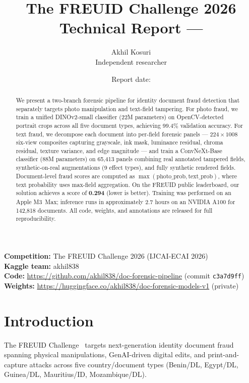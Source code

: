 \documentclass[11pt,a4paper]{article}
\title{%
  \textbf{The FREUID Challenge 2026}\\[0.4em]
  \large Technical Report --- \teamname
}
\author{%
  Akhil Kosuri\\
  \small Independent researcher\\
  \texttt{\contactemail}
}
\date{Report date: \reportdate}
\newcommand{\kaggleteam}{akhil838}
\begin{document}
\maketitle

\begin{abstract}
We present a two-branch forensic pipeline for identity document fraud detection
that separately targets photo manipulation and text-field tampering.
For photo fraud, we train a unified DINOv2-small classifier (22M parameters) on
OpenCV-detected portrait crops across all five document types, achieving 99.4\%
validation accuracy.
For text fraud, we decompose each document into per-field forensic panels ---
$224 \times 1008$ six-view composites capturing grayscale, ink mask, luminance
residual, chroma residual, texture variance, and edge magnitude --- and train
a ConvNeXt-Base classifier (88M parameters) on 65{,}413 panels combining real
annotated tampered fields, synthetic-on-real augmentations (9 effect types), and
fully synthetic rendered fields.
Document-level fraud scores are computed as $\max(\text{photo\_prob}, \text{text\_prob})$,
where text probability uses max-field aggregation.
On the FREUID public leaderboard, our solution achieves a score of \textbf{0.294}
(lower is better). Training was performed on an Apple M3~Max;
inference runs in approximately 2.7 hours on an NVIDIA A100 for 142{,}818 documents.
All code, weights, and annotations are released for full reproducibility.
\end{abstract}

\noindent\textbf{Competition:} The FREUID Challenge 2026 (IJCAI-ECAI 2026)\\
\textbf{Kaggle team:} \kaggleteam\\
\textbf{Code:} \url{https://github.com/akhil838/doc-forensic-pipeline}
(commit \texttt{c3a7d9ff})\\
\textbf{Weights:} \url{https://huggingface.co/akhil838/doc-forensic-models-v1} (private)\\

\section{Introduction}
\label{sec:intro}

The FREUID Challenge~\cite{freuid2026} targets next-generation identity document
fraud spanning physical manipulations, GenAI-driven digital edits, and
print-and-capture attacks across five country/document types
(Benin/DL, Egypt/DL, Guinea/DL, Mauritius/ID, Mozambique/DL).
\end{document}
